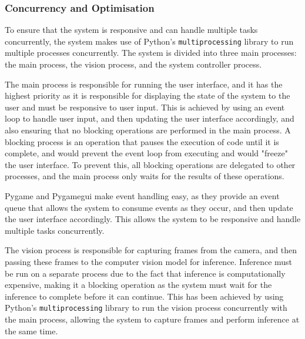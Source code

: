 \subsubsection{Concurrency and Optimisation}
\label{sec:concurrency}
To ensure that the system is responsive and can handle multiple tasks concurrently, the system makes use of Python's \texttt{multiprocessing} library to run multiple processes concurrently. The system is divided into three main processes: the main process, the vision process, and the system controller process.

The main process is responsible for running the user interface, and it has the highest priority as it is responsible for displaying the state of the system to the user and must be responsive to user input. This is achieved by using an event loop to handle user input, and then updating the user interface accordingly, and also ensuring that no blocking operations are performed in the main process. A blocking process is an operation that pauses the execution of code until it is complete, and would prevent the event loop from executing and would "freeze" the user interface. To prevent this, all blocking operations are delegated to other processes, and the main process only waits for the results of these operations.

Pygame and Pygamegui make event handling easy, as they provide an event queue that allows the system to consume events as they occur, and then update the user interface accordingly. This allows the system to be responsive and handle multiple tasks concurrently. 

The vision process is responsible for capturing frames from the camera, and then passing these frames to the computer vision model for inference. Inference must be run on a separate process due to the fact that inference is computationally expensive, making it a blocking operation as the system must wait for the inference to complete before it can continue. This has been achieved by using Python's \texttt{multiprocessing} library to run the vision process concurrently with the main process, allowing the system to capture frames and perform inference at the same time.

